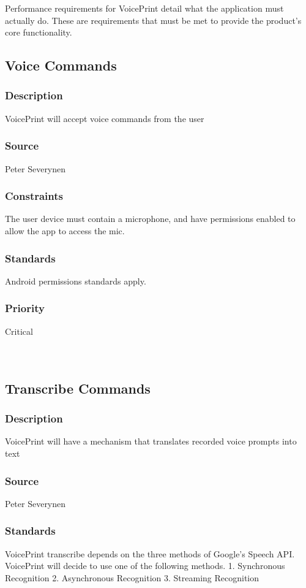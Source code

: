 Performance requirements for VoicePrint detail what the application must actually do. These are requirements that must be met to provide the product's core functionality.

\subsection{Voice Commands}
\subsubsection{Description}
VoicePrint will accept voice commands from the user
\subsubsection{Source}
Peter Severynen
\subsubsection{Constraints}
The user device must contain a microphone, and have permissions enabled to allow the app to access the mic.
\subsubsection{Standards}
Android permissions standards apply.
\subsubsection{Priority}
Critical\\
\\
\\
\subsection{Transcribe Commands}
\subsubsection{Description}
VoicePrint will have a mechanism that translates recorded voice prompts into text
\subsubsection{Source}
Peter Severynen
\subsubsection{Standards}
VoicePrint transcribe depends on the three methods of Google's Speech API. VoicePrint will decide to use one of the following methods.
1. Synchronous Recognition
2. Asynchronous Recognition
3. Streaming Recognition \cite{GoogleCloud}
